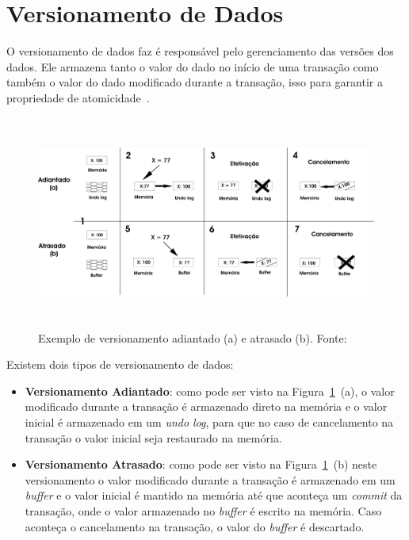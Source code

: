 \documentclass[ti]{texufpel}
\begin{document}
\section{Versionamento de Dados}

O versionamento de dados faz é responsável pelo gerenciamento das versões dos dados. Ele armazena tanto o valor do dado no início de uma transação como também o valor do dado modificado durante a transação, isso para garantir a propriedade de atomicidade~\cite{baldassinTese09}.

\begin{figure}[!htp]
\centering
\includegraphics[height=7cm]{Imagens/versionamento.png}
\caption{Exemplo de versionamento adiantado (a) e atrasado (b). Fonte:~\cite{baldassinTese09}}
\label{figuraVersionamento}
\end{figure}

Existem dois tipos de versionamento de dados:

\begin{itemize}
 \item \textbf{Versionamento Adiantado}: como pode ser visto na Figura~\ref{figuraVersionamento}~(a), o valor modificado durante a transação é armazenado direto na memória e o valor inicial é armazenado em um \emph{undo log}, para que no caso de cancelamento na transação o valor inicial seja restaurado na memória.

 \item \textbf{Versionamento Atrasado}: como pode ser visto na Figura~\ref{figuraVersionamento}~(b) neste versionamento o valor modificado durante a transação é armazenado em um \emph{buffer} e o valor inicial é mantido na memória até que aconteça um \emph{commit} da transação, onde o valor armazenado no \emph{buffer} é escrito na memória. Caso aconteça o cancelamento na transação, o valor do \emph{buffer} é descartado.
\end{itemize}
\end{document}
